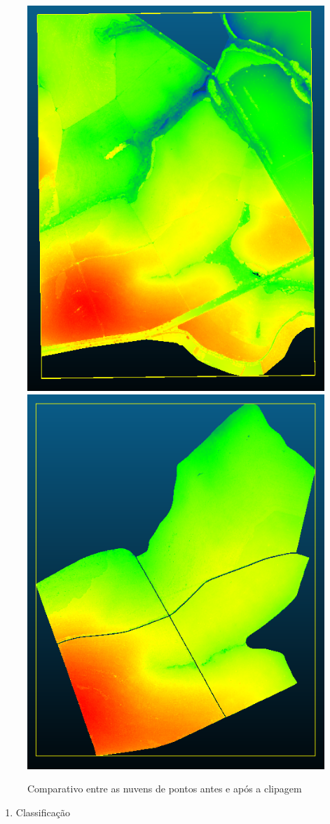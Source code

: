 \documentclass[
]{article}
\providecommand{\tightlist}{%
  \setlength{\itemsep}{0pt}\setlength{\parskip}{0pt}}
\begin{document}
\begin{figure}

{\centering \includegraphics[width=0.4\linewidth]{IMAGES/pre-clipagem-passo8} \includegraphics[width=0.4\linewidth]{IMAGES/pos-clipagem-passo8} 

}

\caption{Comparativo entre as nuvens de pontos antes e após a clipagem}\label{fig:unnamed-chunk-12}
\end{figure}

\newpage

\begin{enumerate}
\def\labelenumi{\arabic{enumi}.}
\setcounter{enumi}{7}
\tightlist
\item
  Classificação
\end{enumerate}
\end{document}
